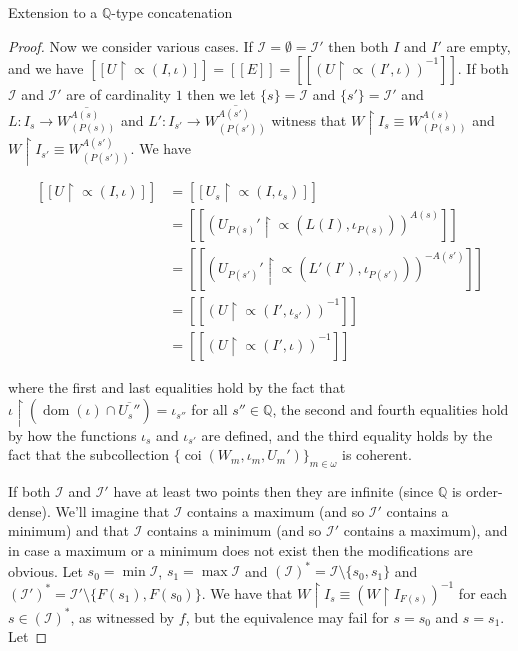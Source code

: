 \documentclass{amsart}
\theoremstyle{definition}\newtheorem{theorem}{Theorem}
\theoremstyle{definition}\newtheorem*{A}{Main Theorem}
\theoremstyle{definition}\newtheorem*{B}{Theorem \ref{elementaryequiv}}
\theoremstyle{definition}\newtheorem*{C}{Theorem \ref{continuous}}
\theoremstyle{definition}\newtheorem*{D}{Theorem \ref{bigisomorphism2}}
\theoremstyle{definition}\newtheorem{bigtheorem}{Main Theorem}
\numberwithin{theorem}{section}
\theoremstyle{definition}\newtheorem{corollary}[theorem]{Corollary}
\theoremstyle{definition}\newtheorem{proposition}[theorem]{Proposition}
\theoremstyle{definition}\newtheorem{definition}[theorem]{Definition}
\theoremstyle{definition}\newtheorem{question}[theorem]{Question}
\theoremstyle{definition}\newtheorem{example}[theorem]{Example}
\theoremstyle{definition}\newtheorem{remark}[theorem]{Remark}
\theoremstyle{definition}\newtheorem{note}[theorem]{Note}
\theoremstyle{definition}\newtheorem{lemma}[theorem]{Lemma}
\theoremstyle{definition}\newtheorem{fact}[theorem]{Fact}
\theoremstyle{definition}\newtheorem{define}[theorem]{Definition}
\theoremstyle{definition}\newtheorem{claim}[theorem]{Claim}
\theoremstyle{definition}\newtheorem{obs}[theorem]{Observation}
\theoremstyle{definition}\newtheorem{definitions}[theorem]{Definitions}
\newcommand{\coi}{\operatorname{coi}}
\newcommand{\dom}{\operatorname{dom}}
\begin{document}
\begin{section}{Extension to a $\mathbb{Q}$-type concatenation}
\begin{proof}
Now we consider various cases.  If $\mathcal{I} = \emptyset = \mathcal{I}'$ then both $I$ and $I'$ are empty, and we have $[[U \upharpoonright\varpropto(I, \iota)]] = [[E]] = [[(U \upharpoonright\varpropto(I', \iota))^{-1}]]$.  If both $\mathcal{I}$ and $\mathcal{I}'$ are of cardinality $1$ then we let $\{s\} = \mathcal{I}$ and $\{s'\} = \mathcal{I}'$ and $L: I_s \rightarrow \overline{W_{(P(s))}^{A(s)}}$ and $L': I_{s'} \rightarrow \overline{W_{(P(s'))}^{A(s')}}$ witness that $W \upharpoonright I_s \equiv W_{(P(s))}^{A(s)}$ and $W\upharpoonright I_{s'} \equiv W_{(P(s'))}^{A(s')}$.  We have


$$
\begin{array}{ll}
[[U \upharpoonright \varpropto(I, \iota)]] & = [[U_s \upharpoonright \varpropto(I, \iota_s)]]\\
& = [[(U_{P(s)}' \upharpoonright \varpropto(L(I), \iota_{P(s)}))^{A(s)}]]\\
& = [[(U_{P(s')}' \upharpoonright \varpropto(L'(I'), \iota_{P(s')}))^{-A(s')}]]\\
& = [[(U \upharpoonright \varpropto(I', \iota_{s'}))^{-1}]]\\
& = [[(U \upharpoonright \varpropto(I', \iota))^{-1}]]

\end{array}
$$

\noindent where the first and last equalities hold by the fact that $\iota \upharpoonright (\dom(\iota) \cap \overline{U_s''}) = \iota_{s''}$ for all $s'' \in \mathbb{Q}$, the second and fourth equalities hold by how the functions $\iota_s$ and $\iota_{s'}$ are defined, and the third equality holds by the fact that the subcollection $\{\coi(W_m, \iota_m, U_m')\}_{m \in \omega}$ is coherent.

If both $\mathcal{I}$ and $\mathcal{I}'$ have at least two points then they are infinite (since $\mathbb{Q}$ is order-dense).  We'll imagine that $\mathcal{I}$ contains a maximum (and so $\mathcal{I}'$ contains a minimum) and that $\mathcal{I}$ contains a minimum (and so $\mathcal{I}'$ contains a maximum), and in case a maximum or a minimum does not exist then the modifications are obvious.  Let $s_0 = \min\mathcal{I}$, $s_1 = \max\mathcal{I}$ and $(\mathcal{I})^* = \mathcal{I} \setminus \{s_0, s_1\}$ and $(\mathcal{I}')^* = \mathcal{I}' \setminus \{F(s_1), F(s_0)\}$.  We have that $W \upharpoonright I_s \equiv (W \upharpoonright I_{F(s)})^{-1}$ for each $s \in (\mathcal{I})^*$, as witnessed by $f$, but the equivalence may fail for $s = s_0$ and $s = s_1$.  Let


\end{proof}
\end{section}
\end{document}
